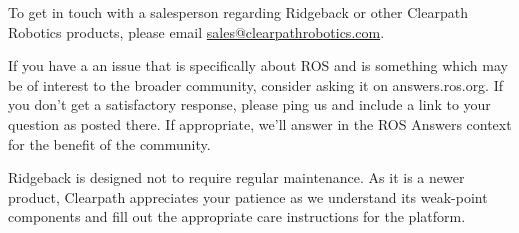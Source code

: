 \documentclass[]{clearpath-latex/clearpath-manual}
\begin{document}
To get in touch with a salesperson regarding Ridgeback or other Clearpath Robotics products, please email
\url{sales@clearpathrobotics.com}.

If you have a an issue that is specifically about ROS and is something which may be of interest to the broader
community, consider asking it on answers.ros.org. If you don’t get a satisfactory response, please ping us and
include a link to your question as posted there. If appropriate, we’ll answer in the ROS Answers context for
the benefit of the community.

Ridgeback is designed not to require regular maintenance. As it is a newer product, Clearpath appreciates your
patience as we understand its weak-point components and fill out the appropriate care instructions for the
platform.
\end{document}
